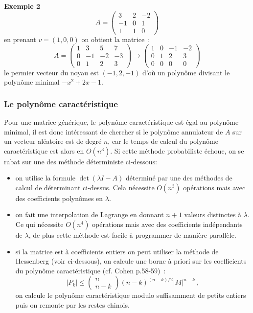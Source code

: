 \documentclass[a4paper,11pt]{article}
\begin{document}
{\bf Exemple 2}\\
\[ A=\left(\begin{array}{ccc}
 3 & 2 & -2 \\
-1 &0 &1 \\
1 & 1 & 0 
\end{array}\right) \]
en prenant $v=(1,0,0)$ on obtient la matrice~:
\[ A=\left(\begin{array}{cccc}
1 & 3 & 5 & 7 \\
0 & -1 & -2 & -3 \\
0 & 1 & 2 & 3
\end{array}\right) \rightarrow
\left(\begin{array}{cccc}
1 & 0 & -1 & -2 \\
0 & 1 & 2 & 3 \\
0 & 0 & 0 & 0 
\end{array}\right) \]
le permier vecteur du noyau est $(-1,2,-1)$ d'où un polynôme divisant
le polynôme minimal $-x^2+2x-1$.

\subsubsection{Le polyn\^ome caract\'eristique}
Pour une matrice générique, le polynôme caractéristique est égal
au polynôme minimal, il est donc intéressant de chercher si le polynôme
annulateur de $A$ sur un vecteur aléatoire est de degré $n$, 
car le temps de calcul du polynôme caractéristique est alors en $O(n^3)$. 
Si cette méthode probabiliste échoue, on se
rabat sur une des méthode déterministe ci-dessous:
\begin{itemize}
\item on utilise la formule $\det(\lambda I -A)$ déterminé par
une des m\'ethodes de calcul de d\'eterminant ci-dessus. Cela
nécessite $O(n^3)$ opérations mais avec des coefficients 
polynômes en $\lambda$.
\item on fait une interpolation de Lagrange en donnant $n+1$ valeurs
distinctes \`a $\lambda$. Ce qui nécessite $O(n^4)$ opérations mais avec
des coefficients indépendants de $\lambda$, de plus cette m\'ethode 
est facile \`a programmer de mani\`ere parall\`ele.
\item si la matrice est \`a coefficients entiers
on peut utiliser la m\'ethode de Hessenberg (voir ci-dessous), on calcule
une borne \`a priori sur les coefficients du polyn\^ome caract\'eristique
(cf. Cohen p.58-59)~:
\[ |P_k| \leq \left( \begin{array}{c} n \\ n-k\end{array}\right) 
(n-k)^{(n-k)/2} |M|^{n-k} \ ,\]
on calcule le polyn\^ome caract\'eristique modulo suffisamment
de petits entiers puis on remonte par les restes chinois.
\end{itemize}
\end{document}
